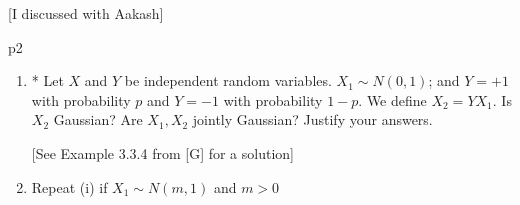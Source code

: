 \documentclass[a4paper, 11pt]{article}
\begin{document}
[I discussed with Aakash]\parinn

\begin{problem}{%
    }{p2%
    }
    \begin{enumerate}[label=(\roman*)]
        \item * Let $X$ and $Y$ be independent random variables. $X_1\sim N(0,1)$; and $Y=+1$ with probability $p$ and $Y=-1$ with probability $1-p$. We define $X_2=YX_1$. Is $X_2$ Gaussian? Are $X_1,X_2$ jointly Gaussian? Justify your answers.

            [See Example 3.3.4 from [G] for a solution]
        \item Repeat (i) if $X_1\sim N(m,1)$ and $m>0$
    \end{enumerate}
\end{problem}
\end{document}
